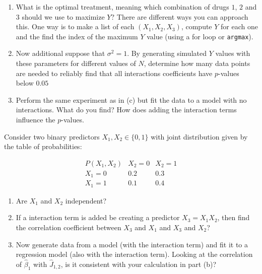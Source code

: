 \begin{exercise}
\begin{enumerate}[label=(\alph*)]
What is the interpretation of each coefficient? 
\item 
What is the optimal treatment, meaning which combination of drugs $1$, $2$ and $3$ should we use to maximize $Y$? There are different ways you can approach this. One way is to make a list of each $(X_1,X_2,X_3)$, compute $Y$ for each one and the find the index of the maximum $Y$ value (using a for loop or \verb!argmax!). 
\item Now additional suppose that $\sigma^2 = 1$. 
By generating simulated $Y$ values with these parameters for different values of $N$, determine how many data points are needed to reliably find that all interactions coefficients have $p$-values below $0.05$
\item Perform the same experiment as in (c) but fit the data to a model with no interactions. What do you find? How does adding the interaction terms influence the $p$-values. 
\end{enumerate}
\end{exercise}


\begin{exercise}[\ding{111}]
Consider two binary predictors \(X_1, X_2 \in \{0,1\}\) with joint distribution given by the table of probabilities:

\[
\begin{array}{c|cc}
P(X_1, X_2) & X_2=0 & X_2=1 \\ \hline
X_1=0 & 0.2 & 0.3 \\
X_1=1 & 0.1 & 0.4
\end{array}
\]

\begin{enumerate}[label=(\alph*)]
\item Are $X_1$ and $X_2$ independent? 
\item If a interaction term is added be creating a predictor $X_3 = X_1X_2$, then find the correlation coefficient between $X_3$ and $X_1$ and $X_3$ and $X_2$? 
\item Now generate data from a model (with the interaction term) and fit it to a regression model (also with the interaction term). Looking at the correlation of $\hat{\beta}_1$ with $\hat{J}_{1,2}$, is it consistent with your calculation in part (b)? 
\end{enumerate}
\end{exercise}


